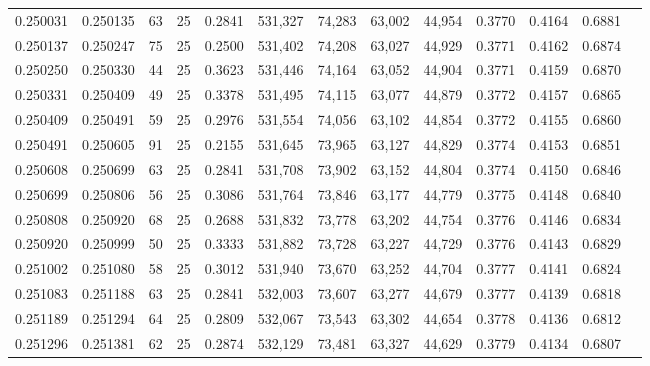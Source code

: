 \begin{tabular}{rrrrrrrrrrrrr}
0.250031 & 0.250135 &    63 &  25 &                                     0.2841 & 531,327 &  74,283 &  63,002 &  44,954 & 0.3770 & 0.4164 & 0.6881 \\
0.250137 & 0.250247 &    75 &  25 &                                     0.2500 & 531,402 &  74,208 &  63,027 &  44,929 & 0.3771 & 0.4162 & 0.6874 \\
0.250250 & 0.250330 &    44 &  25 &                                     0.3623 & 531,446 &  74,164 &  63,052 &  44,904 & 0.3771 & 0.4159 & 0.6870 \\
0.250331 & 0.250409 &    49 &  25 &                                     0.3378 & 531,495 &  74,115 &  63,077 &  44,879 & 0.3772 & 0.4157 & 0.6865 \\
0.250409 & 0.250491 &    59 &  25 &                                     0.2976 & 531,554 &  74,056 &  63,102 &  44,854 & 0.3772 & 0.4155 & 0.6860 \\
0.250491 & 0.250605 &    91 &  25 &                                     0.2155 & 531,645 &  73,965 &  63,127 &  44,829 & 0.3774 & 0.4153 & 0.6851 \\
0.250608 & 0.250699 &    63 &  25 &                                     0.2841 & 531,708 &  73,902 &  63,152 &  44,804 & 0.3774 & 0.4150 & 0.6846 \\
0.250699 & 0.250806 &    56 &  25 &                                     0.3086 & 531,764 &  73,846 &  63,177 &  44,779 & 0.3775 & 0.4148 & 0.6840 \\
0.250808 & 0.250920 &    68 &  25 &                                     0.2688 & 531,832 &  73,778 &  63,202 &  44,754 & 0.3776 & 0.4146 & 0.6834 \\
0.250920 & 0.250999 &    50 &  25 &                                     0.3333 & 531,882 &  73,728 &  63,227 &  44,729 & 0.3776 & 0.4143 & 0.6829 \\
0.251002 & 0.251080 &    58 &  25 &                                     0.3012 & 531,940 &  73,670 &  63,252 &  44,704 & 0.3777 & 0.4141 & 0.6824 \\
0.251083 & 0.251188 &    63 &  25 &                                     0.2841 & 532,003 &  73,607 &  63,277 &  44,679 & 0.3777 & 0.4139 & 0.6818 \\
0.251189 & 0.251294 &    64 &  25 &                                     0.2809 & 532,067 &  73,543 &  63,302 &  44,654 & 0.3778 & 0.4136 & 0.6812 \\
0.251296 & 0.251381 &    62 &  25 &                                     0.2874 & 532,129 &  73,481 &  63,327 &  44,629 & 0.3779 & 0.4134 & 0.6807 \\

\end{tabular}
